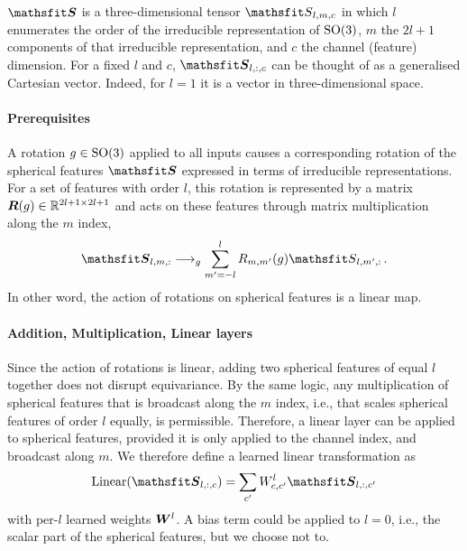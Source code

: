 \documentclass[10pt]{article} %
\begin{document}
$\tS$ is a three-dimensional tensor $\etS_{l,m,c}$ in which $l$ enumerates the order of the irreducible representation of $\text{SO}(3)$, $m$ the $2l+1$ components of that irreducible representation, and $c$ the channel (feature) dimension. For a fixed $l$ and $c$, $\tS_{l,:,c}$ can be thought of as a generalised Cartesian vector. Indeed, for $l=1$ it is a vector in three-dimensional space.

\paragraph{Prerequisites} A rotation $g \in \text{SO}(3)$ applied to all inputs causes a corresponding rotation of the spherical features $\tS$ expressed in terms of irreducible representations. For a set of features with order $l$, this rotation is represented by a matrix ${\bm{R}}(g) \in \mathbb{R}^{2l+1 \times 2l+1}$ and acts on these features through matrix multiplication along the $m$ index,
\begin{equation}
    \tS_{l,m,:} \longrightarrow_{g} \sum_{m'=-l}^{l} \emR_{m,m'}(g) \etS_{l,m',:} \, .
\end{equation}
In other word, the action of rotations on spherical features is a linear map.

\paragraph{Addition, Multiplication, Linear layers} Since the action of rotations is linear, adding two spherical features of equal $l$ together does not disrupt equivariance. By the same logic, any multiplication of spherical features that is broadcast along the $m$ index, i.e., that scales spherical features of order $l$ equally, is permissible.
Therefore, a linear layer can be applied to spherical features, provided it is only applied to the channel index, and broadcast along $m$. We therefore define a learned linear transformation as
\begin{equation}
    \text{Linear}(\tS_{l,:,c}) = \sum_{c'} \emW_{c,c'}^l \tS_{l,:,c'}
\end{equation}
with per-$l$ learned weights ${\bm{W}}^l$. A bias term could be applied to $l=0$, i.e., the scalar part of the spherical features, but we choose not to.
\end{document}
